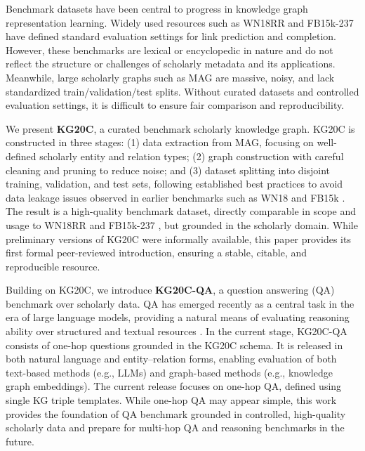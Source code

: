 \documentclass[conference]{IEEEtran}
\begin{document}
Benchmark datasets have been central to progress in knowledge graph representation learning. Widely used resources such as WN18RR \cite{dettmers_convolutional2dknowledge_2018, millergeorgea._wordnetlexicaldatabase_1995} and FB15k-237 \cite{toutanova_observedlatentfeatures_2015, bollacker_freebasecollaborativelycreated_2008} have defined standard evaluation settings for link prediction and completion. However, these benchmarks are lexical or encyclopedic in nature and do not reflect the structure or challenges of scholarly metadata and its applications. Meanwhile, large scholarly graphs such as MAG are massive, noisy, and lack standardized train/validation/test splits. Without curated datasets and controlled evaluation settings, it is difficult to ensure fair comparison and reproducibility.

We present \textbf{KG20C}, a curated benchmark scholarly knowledge graph. KG20C is constructed in three stages: (1) data extraction from MAG, focusing on well-defined scholarly entity and relation types; (2) graph construction with careful cleaning and pruning to reduce noise; and (3) dataset splitting into disjoint training, validation, and test sets, following established best practices to avoid data leakage issues observed in earlier benchmarks such as WN18 and FB15k \cite{bordes_translatingembeddingsmodeling_2013}. The result is a high-quality benchmark dataset, directly comparable in scope and usage to WN18RR and FB15k-237 \cite{dettmers_convolutional2dknowledge_2018, toutanova_observedlatentfeatures_2015}, but grounded in the scholarly domain. While preliminary versions of KG20C were informally available, this paper provides its first formal peer-reviewed introduction, ensuring a stable, citable, and reproducible resource.

Building on KG20C, we introduce \textbf{KG20C-QA}, a question answering (QA) benchmark over scholarly data. QA has emerged recently as a central task in the era of large language models, providing a natural means of evaluating reasoning ability over structured and textual resources \cite{weston_aicompletequestionanswering_2015, nakano_webgptbrowserassistedquestionanswering_2021}. In the current stage, KG20C-QA consists of one-hop questions grounded in the KG20C schema. It is released in both natural language and entity--relation forms, enabling evaluation of both text-based methods (e.g., LLMs) and graph-based methods (e.g., knowledge graph embeddings). The current release focuses on one-hop QA, defined using single KG triple templates. While one-hop QA may appear simple, this work provides the foundation of QA benchmark grounded in controlled, high-quality scholarly data and prepare for multi-hop QA and reasoning benchmarks in the future.
\end{document}
